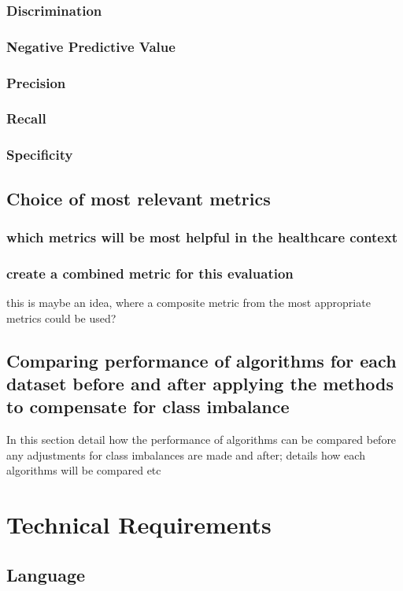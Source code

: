 \subsubsection{Discrimination}
\subsubsection{Negative Predictive Value}
\subsubsection{Precision}
\subsubsection{Recall}
\subsubsection{Specificity}

\subsection{Choice of most relevant metrics}
\subsubsection{which metrics will be most helpful in the healthcare context}
\subsubsection{create a combined metric for this evaluation}
this is maybe an idea, where a composite metric from the most appropriate metrics could be used?

\subsection{Comparing performance of algorithms for each dataset before and after applying the methods to compensate for class imbalance}
In this section detail how the performance of algorithms can be compared before any adjustments for class imbalances are made and after; details how each algorithms will be compared etc

\section{Technical Requirements}
\subsection{Language}
